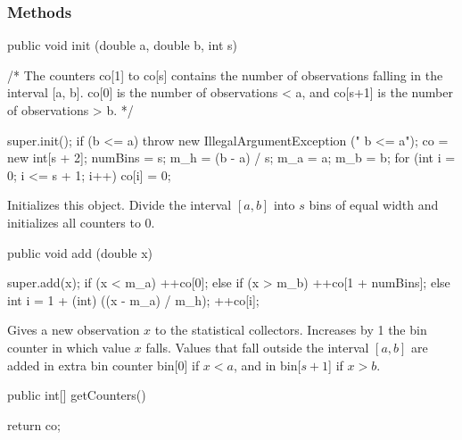 \subsubsection* {Methods}
\begin{code}

   public void init (double a, double b, int s) \begin{hide} {
      /* The counters co[1] to co[s] contains the number of observations
         falling in the interval [a, b]. 
         co[0] is the number of observations < a,
         and co[s+1] is the number of observations > b. 
      */

      super.init();
      if (b <= a) 
         throw new IllegalArgumentException ("   b <= a");
      co = new int[s + 2];
      numBins = s;
      m_h = (b - a) / s;
      m_a = a;
      m_b = b;
      for (int i = 0; i <= s + 1; i++)
         co[i] = 0;
   } \end{hide}
\end{code}
\begin{tabb}  Initializes this object.
Divide the interval $[a,b]$ into $s$ bins of equal width and initializes
all counters to 0.
\end{tabb}
\begin{htmlonly}
\end{htmlonly}
\begin{code}

   public void add (double x) \begin{hide} {
      super.add(x);
      if (x < m_a)
        ++co[0];
      else if (x > m_b)
        ++co[1 + numBins];
      else {
         int i = 1 + (int) ((x - m_a) / m_h);
         ++co[i];
      }
   }\end{hide}
\end{code}
\begin{tabb} Gives a new observation $x$ to the statistical collectors.
Increases by 1 the bin counter in which value $x$ falls.
Values that fall outside the interval $[a,b]$ are added in extra bin
counter bin[0] if $x < a$, and in bin[$s+1$] if $x > b$.
\end{tabb}
\begin{htmlonly}
\end{htmlonly}
\begin{code}

   public int[] getCounters() \begin{hide} {
      return co;
   }\end{hide}
\end{code}
